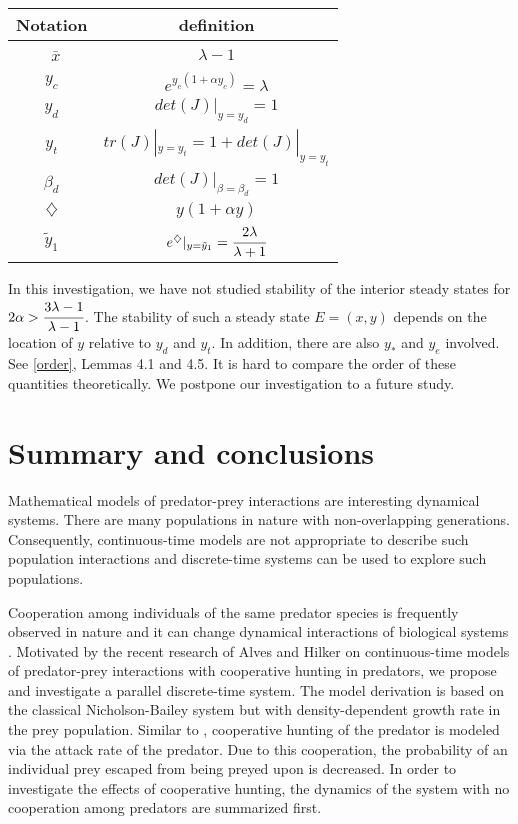 \documentclass[11pt]{article}
\begin{document}
\begin{tabular}{cc}
 Notation & definition\\
 \hline\
 $\bar x$ & $\lambda-1$ \\[1.5ex]
 $y_c$ & $e^{y_c(1+\alpha y_c)}=\lambda$\\[1.5ex]
 $y_d$ & $det(J)|_{y=y_d}=1$ \\[1.5ex]
 $y_t$ & $tr(J)|_{y=y_t}=1+det(J)|_{y=y_t}$\\[1.5ex]
 $\beta_d$ & $det(J)|_{\beta=\beta_d}=1$ \\[1.5ex]
$\diamondsuit$ & $y(1+\alpha y)$ \\[1.5ex]
$\tilde y_1$ & $e^{\diamondsuit}|_{y=\tilde y_1}=\cfrac{2\lambda}{\lambda+1}$\\
 \hline
 \end{tabular}

\bigskip

 In this investigation, we have not studied
stability of the interior steady states for
$2\alpha>\cfrac{3\lambda-1}{\lambda-1}$.
 The stability of such a steady state $E=(x,y)$ depends on the location of $y$ relative to $y_d$ and $y_t$. In addition, there are also $y_*$ and $y_e$ involved.
 See \eqref{order}, Lemmas 4.1 and 4.5.
 It is hard to compare the order of these quantities theoretically. We postpone our investigation to a future study.

\section{Summary and conclusions}
\setcounter{equation}{0} Mathematical models of predator-prey
interactions are interesting dynamical systems. There are many
populations in nature with non-overlapping generations.
Consequently, continuous-time models are not appropriate to
describe such population interactions and discrete-time systems
can be used to explore such populations.


Cooperation among individuals of the same predator species is
frequently observed in nature and it can change dynamical
interactions of biological systems \cite{scheel, uetz}. Motivated
by the recent research of Alves and Hilker \cite{alves} on
continuous-time models of predator-prey interactions with
cooperative hunting in  predators, we propose and investigate a
parallel discrete-time system. The model derivation is based on
the classical Nicholson-Bailey system but with density-dependent
growth rate in the prey population. Similar to \cite{alves},
cooperative hunting of the predator is modeled via the attack rate
of the predator. Due to this cooperation, the probability of an
individual prey escaped from being preyed upon is decreased. In
order to investigate the effects of cooperative hunting, the
dynamics of the system with no cooperation among predators are
summarized first.
\end{document}
